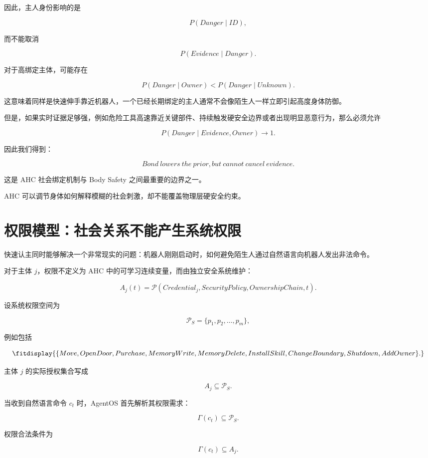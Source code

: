 因此，主人身份影响的是

\[
P(Danger\mid ID),
\]

而不能取消

\[
P(Evidence\mid Danger).
\]

对于高绑定主体，可能存在

\[
P(Danger\mid Owner)
<
P(Danger\mid Unknown).
\]

这意味着同样是快速伸手靠近机器人，一个已经长期绑定的主人通常不会像陌生人一样立即引起高度身体防御。

但是，如果实时证据足够强，例如危险工具高速靠近关键部件、持续触发硬安全边界或者出现明显恶意行为，那么必须允许

\[
P(Danger\mid Evidence,Owner)
\rightarrow 1.
\]

因此我们得到：

\[
\boxed{
Bond\ lowers\ the\ prior,
but\ cannot\ cancel\ evidence.
}
\]

这是 AHC 社会绑定机制与 Body Safety 之间最重要的边界之一。

AHC 可以调节身体如何解释模糊的社会刺激，却不能覆盖物理层硬安全约束。


\section{权限模型：社会关系不能产生系统权限}

快速认主同时能够解决一个非常现实的问题：机器人刚刚启动时，如何避免陌生人通过自然语言向机器人发出非法命令。

对于主体 $j$，权限不定义为 AHC 中的可学习连续变量，而由独立安全系统维护：

\[
A_j(t)
=
\mathcal P
\left(
Credential_j,
SecurityPolicy,
OwnershipChain,
t
\right).
\]

设系统权限空间为

\[
\mathcal P_S
=
\{
p_1,p_2,\ldots,p_m
\},
\]

例如包括

\[
\fitdisplay{
\{
Move,
OpenDoor,
Purchase,
MemoryWrite,
MemoryDelete,
InstallSkill,
ChangeBoundary,
Shutdown,
AddOwner
\}.
}
\]

主体 $j$ 的实际授权集合写成

\[
A_j\subseteq\mathcal P_S.
\]

当收到自然语言命令 $c_t$ 时，AgentOS 首先解析其权限需求：

\[
\Gamma(c_t)
\subseteq
\mathcal P_S.
\]

权限合法条件为

\[
\boxed{
\Gamma(c_t)\subseteq A_j.
}
\]

